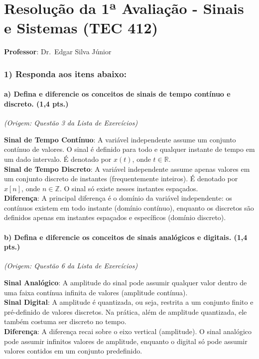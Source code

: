 \chapter{Resolução da 1ª Avaliação - Sinais e Sistemas (TEC 412)}

\textbf{Professor}: Dr.~Edgar Silva Júnior

\subsection{1) Responda aos itens abaixo:}\label{responda-aos-itens-abaixo}

\subsubsection{a) Defina e diferencie os conceitos de sinais de tempo contínuo e discreto. (1,4 pts.)}\label{a-defina-e-diferencie-os-conceitos-de-sinais-de-tempo-contuxednuo-e-discreto.-14-pts.}

\emph{(Origem: Questão 3 da Lista de Exercícios)}

\textbf{Sinal de Tempo Contínuo}: A variável independente assume um conjunto contínuo de valores. O sinal é definido para todo e qualquer instante de tempo em um dado intervalo. É denotado por \(x(t)\), onde \(t \in \mathbb{R}\).\\
\textbf{Sinal de Tempo Discreto}: A variável independente assume apenas valores em um conjunto discreto de instantes (frequentemente inteiros). É denotado por \(x[n]\), onde \(n \in \mathbb{Z}\). O sinal só existe nesses instantes espaçados.\\
\textbf{Diferença}: A principal diferença é o domínio da variável independente: os contínuos existem em todo instante (domínio contínuo), enquanto os discretos são definidos apenas em instantes espaçados e específicos (domínio discreto).

\subsubsection{b) Defina e diferencie os conceitos de sinais analógicos e digitais. (1,4 pts.)}\label{b-defina-e-diferencie-os-conceitos-de-sinais-analuxf3gicos-e-digitais.-14-pts.}

\emph{(Origem: Questão 6 da Lista de Exercícios)}

\textbf{Sinal Analógico}: A amplitude do sinal pode assumir qualquer valor dentro de uma faixa contínua infinita de valores (amplitude contínua).\\
\textbf{Sinal Digital}: A amplitude é quantizada, ou seja, restrita a um conjunto finito e pré-definido de valores discretos. Na prática, além de amplitude quantizada, ele também costuma ser discreto no tempo.\\
\textbf{Diferença}: A diferença recai sobre o eixo vertical (amplitude). O sinal analógico pode assumir infinitos valores de amplitude, enquanto o digital só pode assumir valores contidos em um conjunto predefinido.

